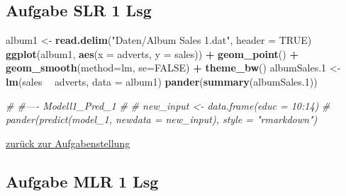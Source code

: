 \documentclass[]{article}
\newenvironment{Shaded}{\begin{snugshade}}{\end{snugshade}}
\newcommand{\KeywordTok}[1]{\textcolor[rgb]{0.13,0.29,0.53}{\textbf{#1}}}
\newcommand{\DataTypeTok}[1]{\textcolor[rgb]{0.13,0.29,0.53}{#1}}
\newcommand{\DecValTok}[1]{\textcolor[rgb]{0.00,0.00,0.81}{#1}}
\newcommand{\StringTok}[1]{\textcolor[rgb]{0.31,0.60,0.02}{#1}}
\newcommand{\CommentTok}[1]{\textcolor[rgb]{0.56,0.35,0.01}{\textit{#1}}}
\newcommand{\OtherTok}[1]{\textcolor[rgb]{0.56,0.35,0.01}{#1}}
\newcommand{\OperatorTok}[1]{\textcolor[rgb]{0.81,0.36,0.00}{\textbf{#1}}}
\newcommand{\NormalTok}[1]{#1}
\begin{document}
\hypertarget{aufgabe-slr-1-lsg}{\subsection*{Aufgabe SLR 1
Lsg}\label{aufgabe-slr-1-lsg}}

\begin{Shaded}
\begin{Highlighting}[]
\NormalTok{  album1       <-}\StringTok{ }\KeywordTok{read.delim}\NormalTok{(}\StringTok{"Daten/Album Sales 1.dat"}\NormalTok{, }\DataTypeTok{header =} \OtherTok{TRUE}\NormalTok{)}
  \KeywordTok{ggplot}\NormalTok{(album1, }\KeywordTok{aes}\NormalTok{(}\DataTypeTok{x =}\NormalTok{ adverts, }\DataTypeTok{y =}\NormalTok{ sales)) }\OperatorTok{+}
\StringTok{    }\KeywordTok{geom_point}\NormalTok{() }\OperatorTok{+}
\StringTok{    }\KeywordTok{geom_smooth}\NormalTok{(}\DataTypeTok{method=}\NormalTok{lm, }\DataTypeTok{se=}\OtherTok{FALSE}\NormalTok{) }\OperatorTok{+}
\StringTok{    }\KeywordTok{theme_bw}\NormalTok{()}
\NormalTok{  albumSales.}\DecValTok{1}\NormalTok{ <-}\StringTok{ }\KeywordTok{lm}\NormalTok{(sales }\OperatorTok{~}\StringTok{ }\NormalTok{adverts, }\DataTypeTok{data =}\NormalTok{ album1)}
  \KeywordTok{pander}\NormalTok{(}\KeywordTok{summary}\NormalTok{(albumSales.}\DecValTok{1}\NormalTok{))}
  
\CommentTok{# #---- Modell1_Pred_1}
\CommentTok{#   }
\CommentTok{#   new_input <- data.frame(educ = 10:14)}
\CommentTok{#   pander(predict(model_1, newdata = new_input), style = "rmarkdown")}
\end{Highlighting}
\end{Shaded}

\protect\hyperlink{aufgabe-slr-1}{zurück zur Aufgabenstellung}

\hypertarget{aufgabe-mlr-1-lsg}{\subsection*{Aufgabe MLR 1
Lsg}\label{aufgabe-mlr-1-lsg}}
\end{document}

